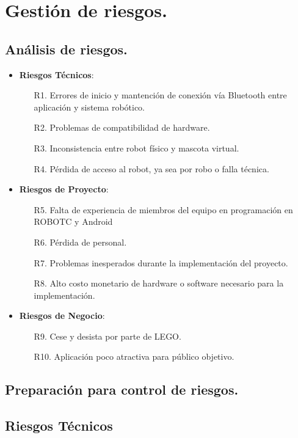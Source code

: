 \section{Gesti\'on de riesgos.}

\subsection{Análisis de riesgos.}

\begin{itemize}
\item {\bf Riesgos Técnicos}:
  \begin{itemize}
  \item[R1.] Errores de inicio y mantención de conexión vía Bluetooth entre aplicación y sistema robótico.
  \item[R2.] Problemas de compatibilidad de hardware.
  \item[R3.] Inconsistencia entre robot físico y mascota virtual.
  \item[R4.] Pérdida de acceso al robot, ya sea por robo o falla técnica.
  \end{itemize}
\item {\bf Riesgos de Proyecto}:
  \begin{itemize}
  \item[R5.] Falta de experiencia de miembros del equipo en programación en ROBOTC y Android
  \item[R6.] Pérdida de personal.
  \item[R7.] Problemas inesperados durante la implementación del proyecto.
  \item[R8.] Alto costo monetario de hardware o software necesario para la implementación.
  \end{itemize}
\item {\bf Riesgos de Negocio}:
  \begin{itemize}
  \item[R9.] Cese y desista por parte de LEGO.
  \item[R10.] Aplicación poco atractiva para público objetivo.
  \end{itemize}
\end{itemize}

\subsection{Preparación para control de riesgos.}

\subsection{Riesgos T\'ecnicos}

